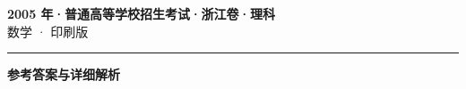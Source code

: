 \documentclass[zihao=5, a4paper]{ctexart}
\begin{document}
\begin{center}
  {\Large\bfseries 2005 年·普通高等学校招生考试·浙江卷·理科}\\[4pt]
  {\large 数学 · 印刷版}
\end{center}
\medskip
{}

\par\bigskip\hrule\bigskip
{}
\begin{center}{\large\bfseries 参考答案与详细解析}\end{center}
\smallskip

\end{document}

